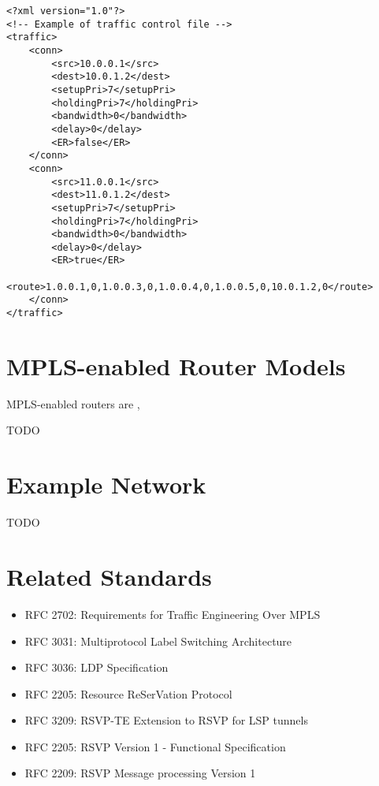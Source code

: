 \begin{verbatim}
<?xml version="1.0"?>
<!-- Example of traffic control file -->
<traffic>
    <conn>
        <src>10.0.0.1</src>
        <dest>10.0.1.2</dest>
        <setupPri>7</setupPri>
        <holdingPri>7</holdingPri>
        <bandwidth>0</bandwidth>
        <delay>0</delay>
        <ER>false</ER>
    </conn>
    <conn>
        <src>11.0.0.1</src>
        <dest>11.0.1.2</dest>
        <setupPri>7</setupPri>
        <holdingPri>7</holdingPri>
        <bandwidth>0</bandwidth>
        <delay>0</delay>
        <ER>true</ER>
        <route>1.0.0.1,0,1.0.0.3,0,1.0.0.4,0,1.0.0.5,0,10.0.1.2,0</route>
    </conn>
</traffic>
\end{verbatim}

\section{MPLS-enabled Router Models}

MPLS-enabled routers are ,  

TODO 

\section{Example Network}

TODO

\section{Related Standards}

\begin{itemize}
  \item RFC 2702: Requirements for Traffic Engineering Over MPLS
  \item RFC 3031: Multiprotocol Label Switching Architecture
  \item RFC 3036: LDP Specification
  \item RFC 2205: Resource ReSerVation Protocol
  \item RFC 3209: RSVP-TE Extension to RSVP for LSP tunnels
  \item RFC 2205: RSVP Version 1 - Functional Specification
  \item RFC 2209: RSVP Message processing Version 1
\end{itemize}

